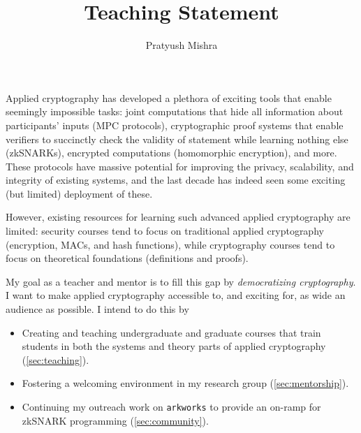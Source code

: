 \documentclass[11pt,letterpaper]{article}
\theoremstyle{definition} %
\theoremstyle{remark} %
\newcommand{\arkworks}{\texttt{arkworks}}
\begin{document}

\title{Teaching Statement}
\author{Pratyush Mishra}
\date{}

\maketitle
\vspace{-2em}

Applied cryptography has developed a plethora of exciting tools that enable seemingly impossible tasks: joint computations that hide all information about participants' inputs (MPC protocols), cryptographic proof systems that enable verifiers to succinctly check the validity of statement while learning nothing else (zkSNARKs), encrypted computations (homomorphic encryption), and more. These protocols have massive potential for improving the privacy, scalability, and integrity of existing systems, and the last decade has indeed seen some exciting (but limited) deployment of these. 

However, existing resources for learning such advanced applied cryptography are limited: security courses tend to focus on traditional applied cryptography (encryption, MACs, and hash functions), while cryptography courses tend to focus on theoretical foundations (definitions and proofs).

My goal as a teacher and mentor is to fill this gap by \emph{democratizing cryptography}. I want to make applied cryptography accessible to, and exciting for, as wide an audience as possible. I intend to do this by 
\begin{itemize}[nolistsep]
  \item Creating and teaching undergraduate and graduate courses that train students in both the systems and theory parts of applied cryptography (\cref{sec:teaching}).
  \item Fostering a welcoming environment in my research group (\cref{sec:mentorship}).
  \item Continuing my outreach work on \arkworks{} to provide an on-ramp for zkSNARK programming (\cref{sec:community}).
\end{itemize}
\end{document}
